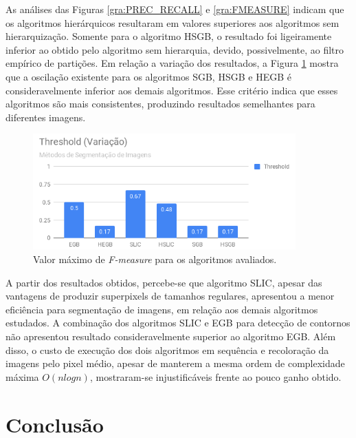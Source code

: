 \begin{document}
As análises das Figuras \ref{gra:PREC_RECALL} e \ref{gra:FMEASURE} indicam que os algoritmos hierárquicos resultaram em valores superiores aos algoritmos sem hierarquização. Somente para o algoritmo HSGB, o resultado foi ligeiramente inferior ao obtido pelo algoritmo sem hierarquia, devido, possivelmente, ao filtro empírico de partições. Em relação a variação dos resultados, a Figura \ref{gra:THRESHOLD} mostra que a oscilação existente para os algoritmos SGB, HSGB e HEGB é consideravelmente inferior aos demais algoritmos. Esse critério indica que esses algoritmos são mais consistentes, produzindo resultados semelhantes para diferentes imagens.

\begin{figure}[ht]
\centering
\includegraphics[width=0.9\textwidth]{graph_threshold.png}
\caption{Valor máximo de \textit{F-measure} para os algoritmos avaliados.}
\label{gra:THRESHOLD}
\end{figure}

A partir dos resultados obtidos, percebe-se que algoritmo SLIC, apesar das vantagens de produzir superpixels de tamanhos regulares, apresentou a menor eficiência para segmentação de imagens, em relação aos demais algoritmos estudados. A combinação dos algoritmos SLIC e EGB para detecção de contornos não apresentou resultado consideravelmente superior ao algoritmo EGB. Além disso, o custo de execução dos dois algoritmos em sequência e recoloração da imagens pelo pixel médio, apesar de manterem a mesma ordem de complexidade máxima $O(nlogn)$, mostraram-se injustificáveis frente ao pouco ganho obtido.



\section{Conclusão} \label{sec:conclusao}
\end{document}
